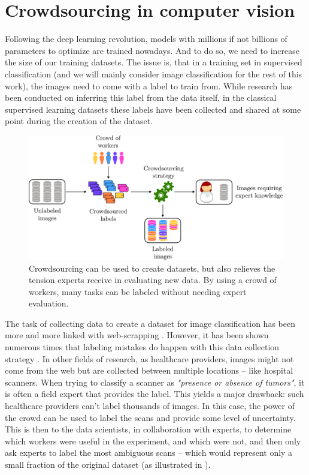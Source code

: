 \section{Crowdsourcing in computer vision}

Following the deep learning revolution, models with millions if not billions of parameters to optimize are trained nowadays. And to do so, we need to increase the size of our training datasets.
The issue is, that in a training set in supervised classification (and we will mainly consider image classification for the rest of this work), the images need to come with a label to train from.
While research has been conducted on inferring this label from the data itself, in the classical supervised learning datasets these labels have been collected and shared at some point during the creation of the dataset.

\begin{figure}[ht]
    \centering
    \includegraphics[width=.8\textwidth]{chapters/images/expert_knowledge.pdf}
    \caption{Crowdsourcing can be used to create datasets, but also relieves the tension experts receive in evaluating new data. By using a crowd of workers, many tasks can be labeled without needing expert evaluation.}
    \label{fig:expert_knowledge}
\end{figure}

The task of collecting data to create a dataset for image classification has been more and more linked with web-scrapping \citep{rhodes2015vaping}.
However, it has been shown numerous times that labeling mistakes do happen with this data collection strategy \citep{northcutt_pervasive_2021,vasudevan2022does}.
In other fields of research, as healthcare providers, images might not come from the web but are collected between multiple locations -- like hospital scanners.
When trying to classify a scanner as \emph{"presence or absence of tumors"}, it is often a field expert that provides the label.
This yields a major drawback: such healthcare providers can't label thousands of images.
In this case, the power of the crowd can be used to label the scans and provide some level of uncertainty.
This is then to the data scientists, in collaboration with experts, to determine which workers were useful in the experiment, and which were not, and then only ask experts to label the most ambiguous scans -- which would represent only a small fraction of the original dataset (as illustrated in ).

